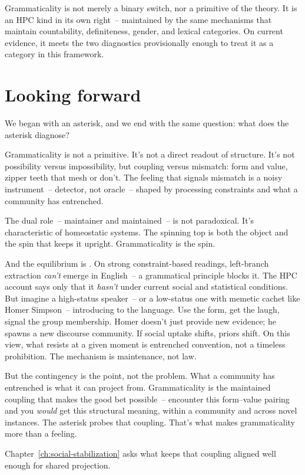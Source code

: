 Grammaticality is not merely a binary switch, nor a primitive of the theory. It is an HPC kind in its own right~-- maintained by the same mechanisms that maintain countability, definiteness, gender, and lexical categories. On current evidence, it meets the two diagnostics provisionally enough to treat it as a category in this framework.



\section{Looking forward}
\label{sec:14:looking-forward}

We began with an asterisk, and we end with the same question: what does the asterisk diagnose?

Grammaticality is not a primitive. It's not a direct readout of structure. It's not possibility versus impossibility, but coupling versus mismatch: form and value, zipper teeth that mesh or don't. The feeling that signals mismatch is a noisy instrument~-- detector, not oracle~-- shaped by processing constraints and what a community has entrenched.

The dual role~-- maintainer and maintained~-- is not paradoxical. It's characteristic of homeostatic systems. The spinning top is both the object and the spin that keeps it upright. Grammaticality is the spin.

And the equilibrium is . On strong constraint-based readings, left-branch extraction \emph{can't} emerge in English~-- a grammatical principle blocks it. The HPC account says only that it \emph{hasn't} under current social and statistical conditions. But imagine a high-status speaker~-- or a low-status one with memetic cachet like Homer Simpson~-- introducing  to the language. Use the form, get the laugh, signal the group membership. Homer doesn't just provide new evidence; he spawns a new discourse community. If social uptake shifts, priors shift. On this view, what resists at a given moment is entrenched convention, not a timeless prohibition. The mechanism is maintenance, not law.

But the contingency is the point, not the problem. What a community has entrenched is what it can project from. Grammaticality is the maintained coupling that makes the good bet possible~-- encounter this form--value pairing and you \emph{would} get this structural meaning, within a community and across novel instances. The asterisk probes that coupling. That's what makes grammaticality more than a feeling.

Chapter~\ref{ch:social-stabilization} asks what keeps that coupling aligned well enough for shared projection.
